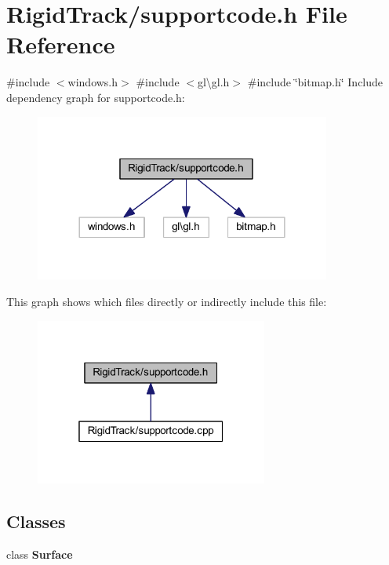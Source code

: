\section{Rigid\+Track/supportcode.h File Reference}
\label{supportcode_8h}
{\ttfamily \#include $<$windows.\+h$>$}\newline
{\ttfamily \#include $<$gl\textbackslash{}gl.\+h$>$}\newline
{\ttfamily \#include \char`\"{}bitmap.\+h\char`\"{}}\newline
Include dependency graph for supportcode.\+h\+:\nopagebreak
\begin{figure}[H]
\begin{center}
\leavevmode
\includegraphics[width=276pt]{supportcode_8h__incl}
\end{center}
\end{figure}
This graph shows which files directly or indirectly include this file\+:\nopagebreak
\begin{figure}[H]
\begin{center}
\leavevmode
\includegraphics[width=217pt]{supportcode_8h__dep__incl}
\end{center}
\end{figure}
\subsection*{Classes}
\begin{DoxyCompactItemize}
\item 
class \textbf{ Surface}
\end{DoxyCompactItemize}

